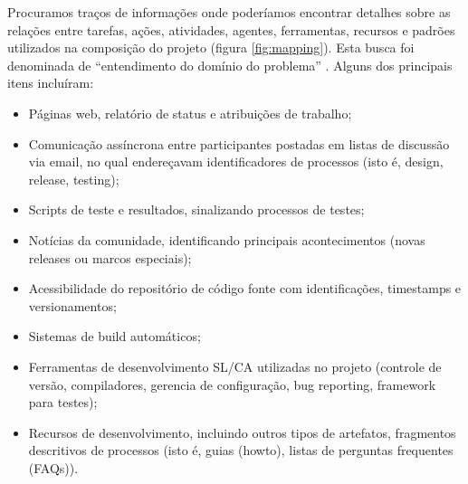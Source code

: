 Procuramos traços de informações onde poderíamos encontrar detalhes sobre as relações entre tarefas, ações, atividades, agentes, ferramentas, recursos e padrões utilizados na composição do projeto (figura \ref{fig:mapping}). Esta busca foi denominada de ``entendimento do domínio do problema'' \cite{experience}. Alguns dos principais itens incluíram:


\begin{itemize}
 \item Páginas web, relatório de status e atribuições de trabalho;
 \item Comunicação assíncrona entre participantes postadas em listas de discussão via email, no qual endereçavam identificadores de processos (isto é, design, release, testing);
 \item Scripts de teste e resultados, sinalizando processos de testes;
 \item Notícias da comunidade, identificando principais acontecimentos (novas releases ou marcos especiais);
 \item Acessibilidade do repositório de código fonte com identificações, timestamps e versionamentos;
 \item Sistemas de build automáticos;
 \item Ferramentas de desenvolvimento SL/CA utilizadas no projeto (controle de versão, compiladores, gerencia de configuração, bug reporting, framework para testes);
 \item Recursos de desenvolvimento, incluindo outros tipos de artefatos, fragmentos descritivos de processos (isto é, guias (howto), listas de perguntas frequentes (FAQs)).
\end{itemize}

